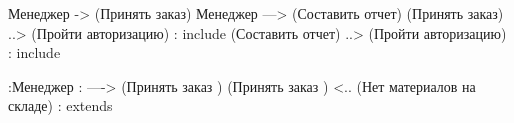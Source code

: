 Менеджер -> (Принять заказ) 
Менеджер —> (Составить отчет) 
(Принять заказ) ..> (Пройти авторизацию) : include 
(Составить отчет) ..> (Пройти авторизацию) : include 

:Менеджер : —-> (Принять заказ ) 
(Принять заказ ) <.. (Нет материалов на складе) : extends
